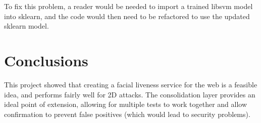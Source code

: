 \documentclass[10pt,a4paper]{article}
\begin{document}
    To fix this problem, a reader would be needed to import a trained libsvm model into sklearn, and the code would then need to be refactored to use the updated sklearn model. 
\section{Conclusions}
    This project showed that creating a facial liveness service for the web is a feasible idea, and performs fairly well for 2D attacks. The consolidation layer provides
    an ideal point of extension, allowing for multiple tests to work together and allow confirmation to prevent false positives (which would lead to security problems).



\end{document}
